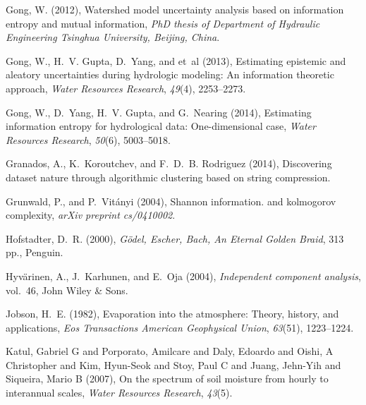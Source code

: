 \documentclass[draft,wrr]{AGUTeX}
\begin{document}
\begin{article}
\begin{thebibliography}{59}
Gong, W. (2012), Watershed model uncertainty analysis based on information
  entropy and mutual information, \textit{PhD thesis of Department of Hydraulic
  Engineering Tsinghua University, Beijing, China}.

Gong, W., H.~V. Gupta, D.~Yang, and et~al (2013), Estimating epistemic and
  aleatory uncertainties during hydrologic modeling: An information theoretic
  approach, \textit{Water Resources Research}, \textit{49}(4), 2253--2273.

Gong, W., D.~Yang, H.~V. Gupta, and G.~Nearing (2014), Estimating information
  entropy for hydrological data: One-dimensional case, \textit{Water Resources
  Research}, \textit{50}(6), 5003--5018.

Granados, A., K.~Koroutchev, and F.~D.~B. Rodriguez (2014), Discovering dataset
  nature through algorithmic clustering based on string compression.

Grunwald, P., and P.~Vit{\'a}nyi (2004), Shannon information. and kolmogorov
  complexity, \textit{arXiv preprint cs/0410002}.

Hofstadter, D.~R. (2000), \textit{G{\"o}del, Escher, Bach, An Eternal Golden
  Braid}, 313 pp., Penguin.

Hyv{\"a}rinen, A., J.~Karhunen, and E.~Oja (2004), \textit{Independent
  component analysis}, vol.~46, John Wiley \& Sons.

Jobson, H.~E. (1982), Evaporation into the atmosphere: Theory, history, and
  applications, \textit{Eos Transactions American Geophysical Union},
  \textit{63}(51), 1223--1224.

Katul, Gabriel G and Porporato, Amilcare and Daly, Edoardo and Oishi, A Christopher and Kim, Hyun-Seok and Stoy, Paul C and Juang, Jehn-Yih and Siqueira, Mario B (2007), On the spectrum of soil moisture from hourly to interannual scales, \textit{Water Resources Research},
  \textit{43}(5).


\end{thebibliography}
\end{article}
\end{document}
